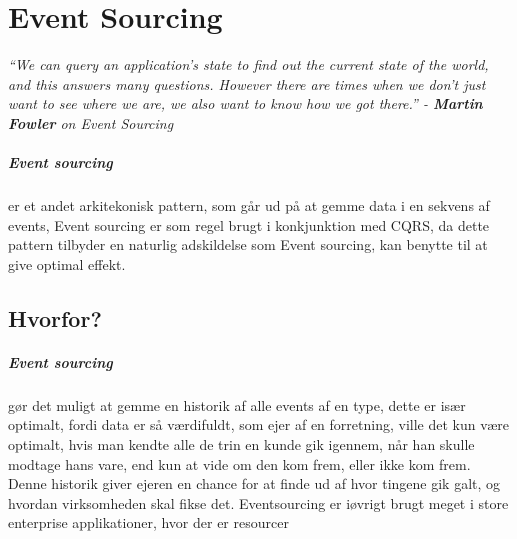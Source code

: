 \chapter{Event Sourcing}

\textit{``We can query an application's state to find out the current state of the world, and this answers many questions. However there are times when we don't just want to see where we are, we also want to know how we got there.'' - \textbf{Martin Fowler} on Event Sourcing}

\paragraph{Event sourcing}
  
er et andet arkitekonisk pattern, som går ud på at gemme data i en sekvens af events, Event sourcing er som regel brugt i konkjunktion med CQRS, da dette pattern tilbyder en naturlig adskildelse som Event sourcing, kan benytte til at give optimal effekt.

\section{Hvorfor?}

\paragraph{Event sourcing} gør det muligt at gemme en historik af alle events af en type, dette er især optimalt, fordi data er så værdifuldt, som ejer af en forretning, ville det kun være optimalt, hvis man kendte alle de trin en kunde gik igennem, når han skulle modtage hans vare, end kun at vide om den kom frem, eller ikke kom frem. Denne historik giver ejeren en chance for at finde ud af hvor tingene gik galt, og hvordan virksomheden skal fikse det. Eventsourcing er iøvrigt brugt meget i store enterprise applikationer, hvor der er resourcer 

